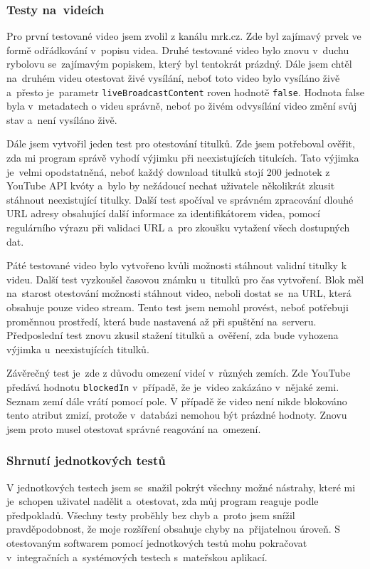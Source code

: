 \subsubsection{Testy na~videích}
\par Pro první testované video jsem zvolil  z kanálu mrk.cz. Zde byl zajímavý prvek ve formě odřádkování v~popisu videa. Druhé testované video bylo znovu v~duchu rybolovu se~zajímavým popiskem, který byl tentokrát prázdný. Dále jsem chtěl na~druhém videu otestovat živé vysílání, neboť toto video bylo vysíláno živě a~přesto je~parametr \texttt{liveBroadcastContent} roven hodnotě \texttt{false}. Hodnota false byla v~metadatech o videu správně, neboť po živém odvysílání video změní svůj stav a~není vysíláno živě.
\par Dále jsem vytvořil jeden test pro otestování titulků. Zde jsem potřeboval ověřit, zda mi program správě vyhodí výjimku při neexistujících titulcích. Tato výjimka je~velmi opodstatněná, neboť každý download titulků stojí 200 jednotek z YouTube API kvóty a~bylo by nežádoucí nechat uživatele několikrát zkusit stáhnout neexistující titulky. Další test spočíval ve správném zpracování dlouhé URL adresy  obsahující další informace za identifikátorem videa, pomocí regulárního výrazu při validaci URL a~pro zkoušku vytažení všech dostupných dat.
\par Páté testované video bylo vytvořeno kvůli možnosti stáhnout validní titulky k videu. Další test vyzkoušel časovou známku u~titulků pro čas vytvoření. Blok  měl na~starost otestování možnosti stáhnout video, neboli dostat se~na URL, která obsahuje pouze video stream. Tento test jsem nemohl provést, neboť potřebuji proměnnou prostředí, která bude nastavená až při spuštění na~serveru. Předposlední test znovu zkusil stažení titulků a~ověření, zda bude vyhozena výjimka u~neexistujících titulků.
\par Závěrečný test je~zde z důvodu omezení videí v~různých zemích. Zde YouTube předává hodnotu \texttt{blockedIn} v~případě, že je~video zakázáno v~nějaké zemi. Seznam zemí dále vrátí pomocí pole. V případě že video není nikde blokováno tento atribut zmizí, protože v~databázi nemohou být prázdné hodnoty. Znovu jsem proto musel otestovat správné reagování na~omezení.
\subsubsection{Shrnutí jednotkových testů}
\par V jednotkových testech jsem se~snažil pokrýt všechny možné nástrahy, které mi je~schopen uživatel nadělit a~otestovat, zda můj program reaguje podle předpokladů. Všechny testy proběhly bez chyb a~proto jsem snížil pravděpodobnost, že moje rozšíření obsahuje chyby na~přijatelnou úroveň. S otestovaným softwarem pomocí jednotkových testů mohu pokračovat v~integračních a~systémových testech s~mateřskou aplikací.
